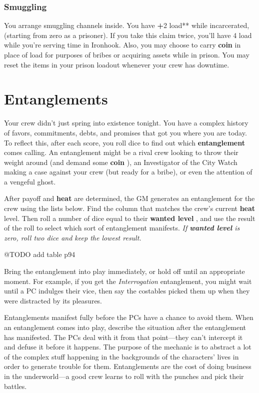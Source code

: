 \documentclass[11pt,fleqn,a5paper]{book}
\newcommand{\gameterm}[1]{\textbf{#1}}
\begin{document}
\subsection{Smuggling}

You arrange smuggling channels inside. You have \textbf{+}2 load** while incarcerated, (starting from zero as a prisoner). If you take this claim twice, you’ll have 4 load while you’re serving time in Ironhook. Also, you may choose to carry \gameterm{coin}  in place of load for purposes of bribes or acquiring assets while in prison. You may reset the items in your prison loadout whenever your crew has downtime.

\chapter{Entanglements}

Your crew didn’t just spring into existence tonight. You have a complex history of favors, commitments, debts, and promises that got you where you are today. To reflect this, after each score, you roll dice to find out which \textbf{entanglement} comes calling. An entanglement might be a rival crew looking to throw their weight around (and demand some \gameterm{coin} ), an Investigator of the City Watch making a case against your crew (but ready for a bribe), or even the attention of a vengeful ghost.

After payoff and \gameterm{heat}  are determined, the GM generates an entanglement for the crew using the lists below. Find the column that matches the crew’s current \gameterm{heat}  level. Then roll a number of dice equal to their \gameterm{wanted level} , and use the result of the roll to select which sort of entanglement manifests. \emph{If \gameterm{wanted level}  is zero, roll two dice and keep the lowest result.}

@TODO add table p94

Bring the entanglement into play immediately, or hold off until an appropriate moment. For example, if you get the \emph{Interrogation} entanglement, you might wait until a PC indulges their vice, then say the costables picked them up when they were distracted by its pleasures.

Entanglements manifest fully before the PCs have a chance to avoid them. When an entanglement comes into play, describe the situation after the entanglement has manifested. The PCs deal with it from that point---they can’t intercept it and defuse it before it happens. The purpose of the mechanic is to abstract a lot of the complex stuff happening in the backgrounds of the characters’ lives in order to generate trouble for them. Entanglements are the cost of doing business in the underworld---a good crew learns to roll with the punches and pick their battles.
\end{document}
